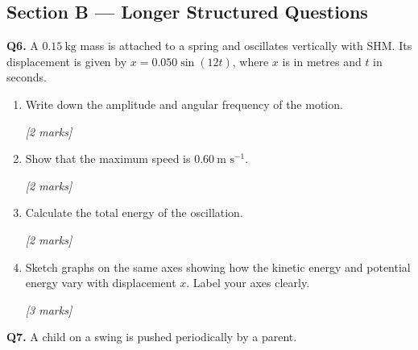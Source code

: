 \subsection*{Section B — Longer Structured Questions}

\begin{tcolorbox}[colback=white, colframe=midblue, breakable]

\begin{minipage}{\linewidth}
\textbf{Q6.} A $0.15\ \text{kg}$ mass is attached to a spring and oscillates vertically with SHM. Its displacement is given by $x = 0.050\sin(12t)$, where $x$ is in metres and $t$ in seconds.
\end{minipage}

\begin{enumerate}[label=(\alph*)]
  \item \begin{minipage}[t]{\linewidth}
  Write down the amplitude and angular frequency of the motion.
  \par\hfill\textit{[2 marks]}
  \vspace{2cm}
  \end{minipage}

  \item \begin{minipage}[t]{\linewidth}
  Show that the maximum speed is $0.60\ \text{m s}^{-1}$.
  \par\hfill\textit{[2 marks]}
  \vspace{3cm}
  \end{minipage}

  \item \begin{minipage}[t]{\linewidth}
  Calculate the total energy of the oscillation.
  \par\hfill\textit{[2 marks]}
  \vspace{3cm}
  \end{minipage}

  \item \begin{minipage}[t]{\linewidth}
  Sketch graphs on the same axes showing how the kinetic energy and potential energy vary with displacement $x$. Label your axes clearly.
  \par\hfill\textit{[3 marks]}
  \vspace{6cm}
  \end{minipage}
\end{enumerate}

\begin{minipage}{\linewidth}
\textbf{Q7.} A child on a swing is pushed periodically by a parent.


\end{minipage}
\end{tcolorbox}
